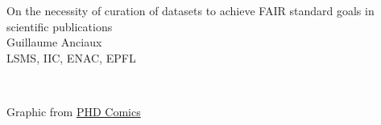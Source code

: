 \documentclass[10pt,compress,serif,aspectratio=169]{beamer}
\begin{document}
\begin{frame}[t]
  \begin{center}
  \vspace{.6cm}
  {\large On the necessity of curation of datasets to achieve FAIR standard goals in scientific publications}\\
  \vspace{.5cm}
  {\Large Guillaume Anciaux}\\{LSMS, IIC, ENAC, EPFL}\\
  \end{center}
\vspace{.5cm}
\qquad {} \\ \vspace{.2cm}

\vspace{.5cm}
  \begin{center}
    \small
    Graphic from \href{http://www.phdcomics.com/comics.php?f=1533}{PHD Comics}
  \end{center}
\end{frame}




\end{document}
